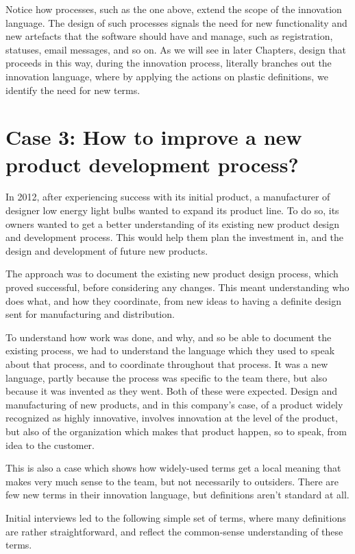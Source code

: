 \documentclass[graybox,envcountchap,sectrefs]{svmono}
\begin{document}
Notice how processes, such as the one above, extend the scope of the innovation language. The design of such processes signals the need for new functionality and new artefacts that the software should have and manage, such as registration, statuses, email messages, and so on. As we will see in later Chapters, design that proceeds in this way, during the innovation process, literally branches out the innovation language, where by applying the actions on plastic definitions, we identify the need for new terms.


\section{Case 3: How to improve a new product development process?}
\label{c5:s4}
In 2012, after experiencing success with its initial product, a manufacturer of designer low energy light bulbs wanted to expand its product line. To do so, its owners wanted to get a better understanding of its existing new product design and development process. This would help them plan the investment in, and the design and development of future new products. 

The approach was to document the existing new product design process, which proved successful, before considering any changes. This meant understanding who does what, and how they coordinate, from new ideas to having a definite design sent for manufacturing and distribution. 

To understand how work was done, and why, and so be able to document the existing process, we had to understand the language which they used to speak about that process, and to coordinate throughout that process. It was a new language, partly because the process was specific to the team there, but also because it was invented as they went. Both of these were expected. Design and manufacturing of new products, and in this company's case, of a product widely recognized as highly innovative, involves innovation at the level of the product, but also of the organization which makes that product happen, so to speak, from idea to the customer. 

This is also a case which shows how widely-used terms get a local meaning that makes very much sense to the team, but not necessarily to outsiders. There are few new terms in their innovation language, but definitions aren't standard at all.

Initial interviews led to the following simple set of terms, where many definitions are rather straightforward, and reflect the common-sense understanding of these terms.
\end{document}
